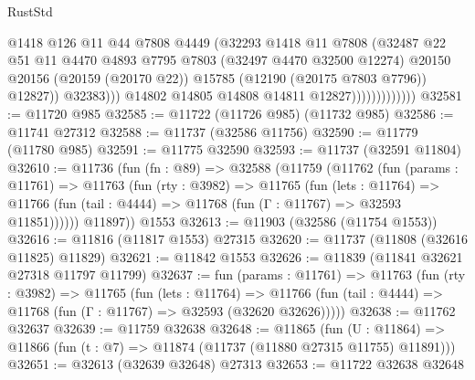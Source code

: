 \begin{lexlean}{RustStd}
\begin{coremodule}
                                    @1418
                                    @126
                                    @11
                                    @44
                                    @7808
                                    @4449
                                    (@32293
                                      @1418
                                      @11
                                      @7808
                                      (@32487
                                        @22
                                        @51
                                        @11
                                        @4470
                                        @4893
                                        @7795
                                        @7803
                                        (@32497 @4470 @32500 @12274)
                                        @20150
                                        @20156
                                        (@20159 (@20170 @22))
                                        @15785
                                        (@12190 (@20175 @7803 @7796))
                                        @12827))
                                    @32383)))
                              @14802
                              @14805
                              @14808
                              @14811
                              @12827)))))))))))))
@32581 := @11720 @985
@32585 := @11722 (@11726 @985) (@11732 @985)
@32586 := @11741 @27312
@32588 := @11737 (@32586 @11756)
@32590 := @11779 (@11780 @985)
@32591 := @11775 @32590
@32593 := @11737 (@32591 @11804)
@32610 := @11736
    (fun (fn : @89) =>
    @32588
      (@11759
        (@11762
          (fun (params : @11761) =>
          @11763
            (fun (rty : @3982) =>
            @11765
              (fun (lets : @11764) =>
              @11766 (fun (tail : @4444) => @11768 (fun (Γ : @11767) => @32593 @11851))))))
        @11897))
    @1553
@32613 := @11903 (@32586 (@11754 @1553))
@32616 := @11816 (@11817 @1553) @27315
@32620 := @11737 (@11808 (@32616 @11825) @11829)
@32621 := @11842 @1553
@32626 := @11839 (@11841 @32621 @27318 @11797 @11799)
@32637 := fun (params : @11761) =>
  @11763
    (fun (rty : @3982) =>
    @11765
      (fun (lets : @11764) =>
      @11766 (fun (tail : @4444) => @11768 (fun (Γ : @11767) => @32593 (@32620 @32626)))))
@32638 := @11762 @32637
@32639 := @11759 @32638
@32648 := @11865
    (fun (U : @11864) => @11866 (fun (t : @7) => @11874 (@11737 (@11880 @27315 @11755) @11891)))
@32651 := @32613 (@32639 @32648) @27313
@32653 := @11722 @32638 @32648

\end{coremodule}
\end{lexlean}
